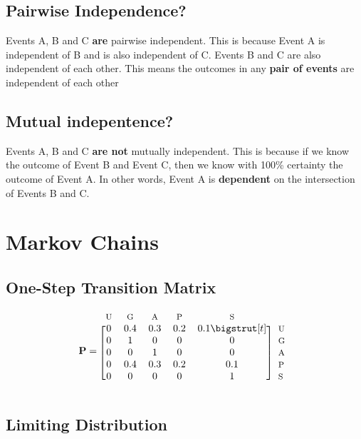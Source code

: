 \documentclass[12pt]{article}
\begin{document}
\subsection{Pairwise Independence?}

Events A, B and C \textbf{are} pairwise independent. This is because Event A is independent of B and is also independent of C. Events B and C are also independent of each other. This means the outcomes in any \textbf{pair of events} are independent of each other

\subsection{Mutual indepentence?}

Events A, B and C \textbf{are not} mutually independent. This is because if we know the outcome of Event B and Event C, then we know with 100\% certainty the outcome of Event A. In other words, Event A is \textbf{dependent} on the intersection of Events B and C.

\section{Markov Chains}

\subsection{One-Step Transition Matrix}
\begin{equation*}
	\mathbf{P}=
	\begin{blockarray}{*{5}{c} l}
	  \begin{block}{*{5}{>{$\footnotesize}c<{$}} l}
		U & G & A & P & S & \\
	  \end{block}
	  \begin{block}{[*{5}{c}]>{$\footnotesize}l<{$}}
		0 & 0.4 & 0.3 & 0.2 & 0.1 \bigstrut[t]& U \\
		0 & 1 & 0 & 0 & 0 & G \\
		0 & 0 & 1 & 0 & 0 & A \\
		0 & 0.4 & 0.3 & 0.2 & 0.1 & P \\
		0 & 0 & 0 & 0 & 1 & S \\
	  \end{block}
	\end{blockarray}
\end{equation*}

\subsection{Limiting Distribution}
	
\end{document}
